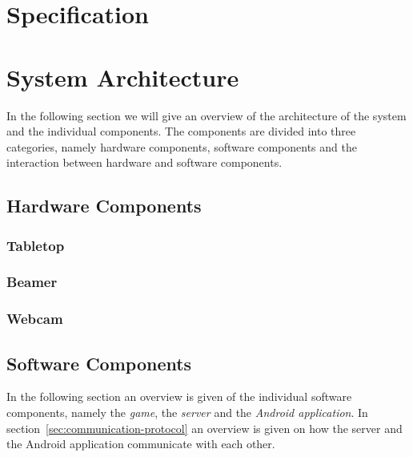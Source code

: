 \documentclass[a4paper,10pt]{article}
\begin{document}
\section{Specification}


\section{System Architecture}
\label{sec:system-architecture}
In the following section we will give an overview of the architecture of the system and the individual components.
The components are divided into three categories, namely hardware components, software components and the interaction between hardware and software components.

	\subsection{Hardware Components}
		
		\subsubsection{Tabletop}
		
		\subsubsection{Beamer}
		
		\subsubsection{Webcam}


	\subsection{Software Components}
	\label{sec:software-components}
	In the following section an overview is given of the individual software components, namely the \emph{game}, the \emph{server} and the \emph{Android application}.
	In section~\ref{sec:communication-protocol} an overview is given on how the server and the Android application communicate with each other.
\end{document}
